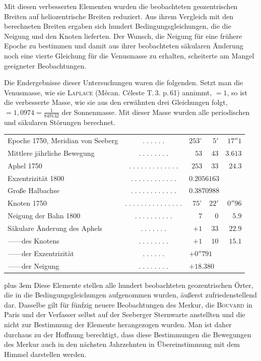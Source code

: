 Mit diesen verbesserten Elementen wurden die beobachteten geozentrischen Breiten auf heliozentrische Breiten reduziert. Aus ihrem Vergleich mit den berechneten Breiten ergaben sich hundert Bedingungsgleichungen, die die Neigung und den Knoten lieferten. Der Wunsch, die Neigung für eine frühere Epoche zu bestimmen und damit aus ihrer beobachteten säkularen Änderung noch eine vierte Gleichung für die Venusmasse zu erhalten, scheiterte am Mangel geeigneter Beobachtungen.

Die Endergebnisse dieser Untersuchungen waren die folgenden.
Setzt man die Venusmasse, wie sie \textsc{Laplace} (Mécan. Céleste T.\,3. p.\,61) annimmt, $= 1$, so ist die verbesserte Masse, wie sie aus den erwähnten drei Gleichungen folgt, $= 1{,}0974 = \frac{1}{849132}$ der Sonnenmasse. Mit dieser Masse wurden alle periodischen und säkularen Störungen berechnet.

\begin{center}\fontsize{9}{11}\selectfont\setlength{\tabcolsep}{2pt}\renewcommand{\arraystretch}{1.18}\begin{tabular}{@{}l c r@{\;}r@{\;}r@{}}
Epoche 1750, Meridian von Seeberg & $.\;.\;.\;.\;.\;.$ & $253^\circ$ & $5'$ & $17''1$\\
Mittlere jährliche Bewegung & $.\;.\;.\;.\;.\;.\;.\;.$ & $53$ & $43$ & $3.613$\\
Aphel 1750 & $.\;.\;.\;.\;.\;.\;.\;.\;.\;.\;.\;.\;.$ & $253$ & $33$ & $24.3$\\
Exzentrizität 1800 & $.\;.\;.\;.\;.\;.\;.\;.\;.\;.\;.\;.$ & \multicolumn{3}{l}{$0.2056163$}\\
Große Halbachse & $.\;.\;.\;.\;.\;.\;.\;.\;.\;.\;.\;.$ & \multicolumn{3}{l}{$0.3870988$}\\
Knoten 1750 & $.\;.\;.\;.\;.\;.\;.\;.\;.\;.\;.\;.\;.\;.\;.$ & $75^\circ$ & $22'$ & $0''96$\\
Neigung der Bahn 1800 & $.\;.\;.\;.\;.\;.\;.\;.\;.\;.$ & $7$ & $0$ & $5.9$\\
Säkulare Änderung des Aphels & $.\;.\;.\;.\;.\;.\;.$ & $+1$ & $33$ & $22.9$\\
\quad —\quad —\quad des Knotens & $.\;.\;.\;.\;.\;.\;.\;.$ & $+1$ & $10$ & $15.1$\\
\quad —\quad —\quad der Exzentrizität & $.\;.\;.\;.\;.\;.$ & \multicolumn{3}{l}{$+0''791$}\\
\quad —\quad —\quad der Neigung & $.\;.\;.\;.\;.\;.\;.\;.$ & \multicolumn{3}{l}{$+18.380$}\\
\end{tabular}\end{center}

{\rightskip=0pt plus 3em Diese Elemente stellen alle hundert beobachteten geozentrischen Örter, die in die Bedingungsgleichungen aufgenommen wurden, äußerst zufriedenstellend dar. Dasselbe gilt für fünfzig neuere Beobachtungen des Merkur, die \textsc{Bouvard} in Paris und der Verfasser selbst auf der Seeberger Sternwarte anstellten und die nicht zur Bestimmung der Elemente herangezogen wurden. Man ist daher durchaus zu der Hoffnung berechtigt, dass diese Bestimmungen die Bewegungen des Merkur auch in den nächsten Jahrzehnten in Übereinstimmung mit dem Himmel darstellen werden.\par}
